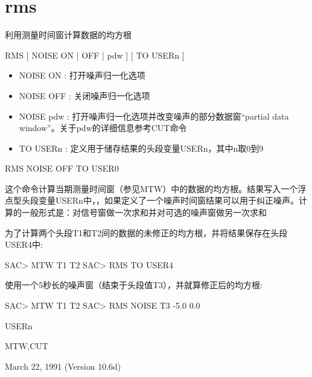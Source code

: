 \section{rms}
\label{cmd:rms}

利用测量时间窗计算数据的均方根

RMS [ NOISE ON | OFF | pdw ] [ TO USERn ]

\begin{itemize}
\item NOISE ON : 打开噪声归一化选项  
\item NOISE OFF : 关闭噪声归一化选项  
\item NOISE pdw : 打开噪声归一化选项并改变噪声的部分数据窗``partial data window''。关于pdw的详细信息参考CUT命令 
\item TO USERn : 定义用于储存结果的头段变量USERn，其中n取0到9 
\end{itemize}

RMS NOISE OFF TO USER0

这个命令计算当期测量时间窗（参见MTW）中的数据的均方根。结果写入一个浮点型头段变量USERn中，，如果定义了一个噪声时间窗结果可以用于纠正噪声。计算的一般形式是：对信号窗做一次求和并对可选的噪声窗做另一次求和

为了计算两个头段T1和T2间的数据的未修正的均方根，并将结果保存在头段USER4中:
\begin{SACCode}
SAC> MTW T1 T2
SAC> RMS TO USER4
\end{SACCode}
使用一个5秒长的噪声窗（结束于头段值T3），并就算修正后的均方根:
\begin{SACCode}
SAC> MTW T1 T2
SAC> RMS NOISE T3 -5.0 0.0
\end{SACCode}

USERn

MTW,CUT

March 22, 1991 (Version 10.6d)

